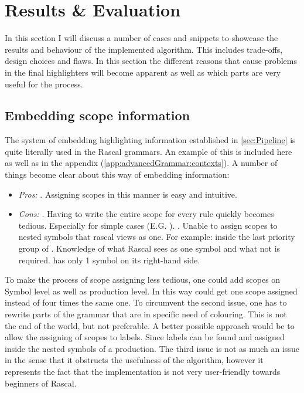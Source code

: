 \chapter{Results \& Evaluation} %

\label{chap:results} %


In this section I will discuss a number of cases and snippets to showcase the results and behaviour of the implemented algorithm. This includes trade-offs, design choices and flaws. In this section the different reasons that cause problems in the final highlighters will become apparent as well as which parts are very useful for the process.

\section{Embedding scope information}
The system of embedding highlighting information established in \ref{sec:Pipeline} is quite literally used in the Rascal grammars. An example of this is included here as well as in the appendix (\ref{app:advancedGrammar:contexts}). A number of things become clear about this way of embedding information:
\begin{itemize}
\item[]\emph{Pros:}
. Assigning scopes in this manner is easy and intuitive. 
\item[]\emph{Cons:}
. Having to write the entire scope for every rule quickly becomes tedious. 
\subsubitem Especially for simple cases (E.G. ). 
. Unable to assign scopes to nested symbols that rascal views as one. 
\subsubitem For example:  inside the last priority group of  
. Knowledge of what Rascal sees as one symbol and what not is required.
\subsubitem {} has only 1 symbol on its right-hand side.
\end{itemize}
\pagebreak
 
To make the process of scope assigning less tedious, one could add scopes on Symbol level as well as production level. In this way  could get one scope assigned instead of four times the same one. To circumvent the second issue, one has to rewrite parts of the grammar that are in specific need of colouring. This is not the end of the world, but not preferable. A better possible approach would be to allow the assigning of scopes to labels. Since labels can be found and assigned inside the nested symbols of a production. The third issue is not as much an issue in the sense that it obstructs the usefulness of the algorithm, however it represents the fact that the implementation is not very user-friendly towards beginners of Rascal.

